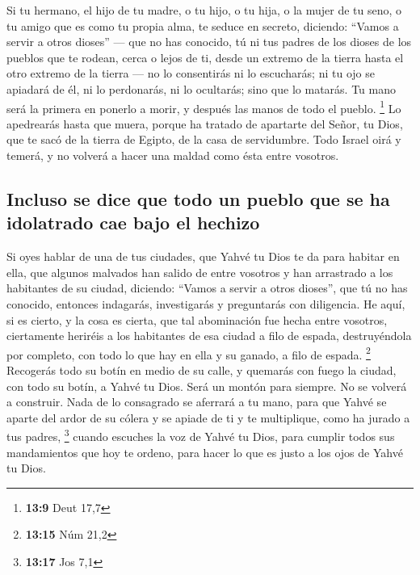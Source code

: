 \begin{paracol}{2}
 Si tu hermano, el hijo de tu madre, o tu hijo, o tu hija,
o la mujer de tu seno, o tu amigo que es como tu propia alma, te seduce
en secreto, diciendo: ``Vamos a servir a otros dioses'' --- que no has
conocido, tú ni tus padres  de los dioses de los pueblos
que te rodean, cerca o lejos de ti, desde un extremo de la tierra hasta
el otro extremo de la tierra ---  no lo consentirás ni lo
escucharás; ni tu ojo se apiadará de él, ni lo perdonarás, ni lo
ocultarás;  sino que lo matarás. Tu mano será la primera
en ponerlo a morir, y después las manos de todo el pueblo. \footnote{\textbf{13:9}
  Deut 17,7}  Lo apedrearás hasta que muera, porque ha
tratado de apartarte del Señor, tu Dios, que te sacó de la tierra de
Egipto, de la casa de servidumbre.  Todo Israel oirá y
temerá, y no volverá a hacer una maldad como ésta entre vosotros.

\hypertarget{incluso-se-dice-que-todo-un-pueblo-que-se-ha-idolatrado-cae-bajo-el-hechizo}{%
\subsection{Incluso se dice que todo un pueblo que se ha idolatrado cae
bajo el
hechizo}\label{incluso-se-dice-que-todo-un-pueblo-que-se-ha-idolatrado-cae-bajo-el-hechizo}}

 Si oyes hablar de una de tus ciudades, que Yahvé tu Dios
te da para habitar en ella, que  algunos malvados han
salido de entre vosotros y han arrastrado a los habitantes de su ciudad,
diciendo: ``Vamos a servir a otros dioses'', que tú no has conocido,
 entonces indagarás, investigarás y preguntarás con
diligencia. He aquí, si es cierto, y la cosa es cierta, que tal
abominación fue hecha entre vosotros,  ciertamente
heriréis a los habitantes de esa ciudad a filo de espada, destruyéndola
por completo, con todo lo que hay en ella y su ganado, a filo de espada.
\footnote{\textbf{13:15} Núm 21,2}  Recogerás todo su
botín en medio de su calle, y quemarás con fuego la ciudad, con todo su
botín, a Yahvé tu Dios. Será un montón para siempre. No se volverá a
construir.  Nada de lo consagrado se aferrará a tu mano,
para que Yahvé se aparte del ardor de su cólera y se apiade de ti y te
multiplique, como ha jurado a tus padres, \footnote{\textbf{13:17} Jos
  7,1}  cuando escuches la voz de Yahvé tu Dios, para
cumplir todos sus mandamientos que hoy te ordeno, para hacer lo que es
justo a los ojos de Yahvé tu Dios.


\end{paracol}
